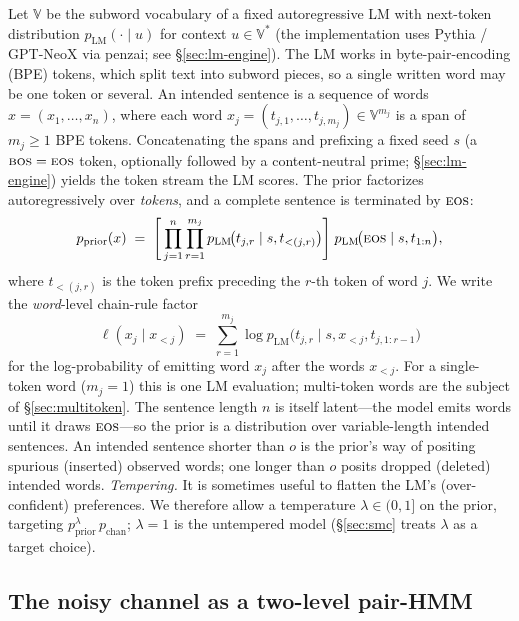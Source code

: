 \documentclass[11pt]{article}
\providecommand{\Vocab}{\mathbb{V}}
\providecommand{\given}{\mid}
\providecommand{\pLM}{p_{\mathrm{LM}}}
\providecommand{\eos}{\textsc{eos}}
\providecommand{\bos}{\textsc{bos}}
\begin{document}
Let $\Vocab$ be the subword vocabulary of a fixed autoregressive LM with next-token distribution $\pLM(\cdot \given u)$ for context $u \in \Vocab^{*}$ (the implementation uses Pythia / GPT-NeoX via penzai; see \S\ref{sec:lm-engine}). The LM works in byte-pair-encoding (BPE) tokens, which split text into subword pieces, so a single written word may be one token or several. An intended sentence is a sequence of words $x = (x_1,\dots,x_n)$, where each word $x_j = (t_{j,1},\dots,t_{j,m_j}) \in \Vocab^{m_j}$ is a span of $m_j \ge 1$ BPE tokens. Concatenating the spans and prefixing a fixed seed $s$ (a $\bos=\eos$ token, optionally followed by a content-neutral prime; \S\ref{sec:lm-engine}) yields the token stream the LM scores. The prior factorizes autoregressively over \emph{tokens}, and a complete sentence is terminated by $\eos$:
\begin{equation}\label{eq:lm-prior}
  p_{\mathrm{prior}}(x)
  \;=\; \Bigg[\prod_{j=1}^{n} \prod_{r=1}^{m_j}
        \pLM\!\big(t_{j,r} \given s, t_{<(j,r)}\big)\Bigg]\;
        \pLM\!\big(\eos \given s, t_{1:n}\big),
\end{equation}
where $t_{<(j,r)}$ is the token prefix preceding the $r$-th token of word $j$. We write the \emph{word}-level chain-rule factor
\begin{equation}\label{eq:lm-word}
  \ell(x_j \given x_{<j}) \;=\; \sum_{r=1}^{m_j} \log \pLM\!\big(t_{j,r}\given s, x_{<j}, t_{j,1:r-1}\big)
\end{equation}
for the log-probability of emitting word $x_j$ after the words $x_{<j}$. For a single-token word ($m_j = 1$) this is one LM evaluation; multi-token words are the subject of \S\ref{sec:multitoken}. The sentence length $n$ is itself latent---the model emits words until it draws $\eos$---so the prior is a distribution over variable-length intended sentences. An intended sentence shorter than $o$ is the prior's way of positing spurious (inserted) observed words; one longer than $o$ posits dropped (deleted) intended words. \emph{Tempering.} It is sometimes useful to flatten the LM's (over-confident) preferences. We therefore allow a temperature $\lambda \in (0,1]$ on the prior, targeting $p_{\mathrm{prior}}^{\lambda}\,p_{\mathrm{chan}}$; $\lambda = 1$ is the untempered model (\S\ref{sec:smc} treats $\lambda$ as a target choice).

\subsection{The noisy channel as a two-level pair-HMM}
\label{sec:channel}
\end{document}
